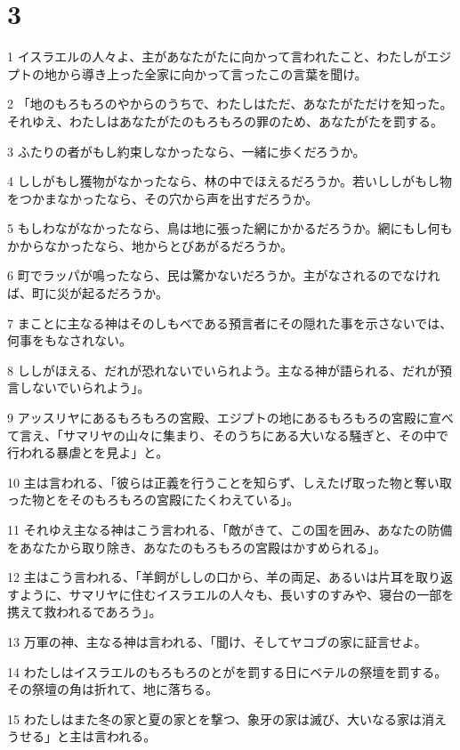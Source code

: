 \chapter{3}

\par 1 イスラエルの人々よ、主があなたがたに向かって言われたこと、わたしがエジプトの地から導き上った全家に向かって言ったこの言葉を聞け。
\par 2 「地のもろもろのやからのうちで、わたしはただ、あなたがただけを知った。それゆえ、わたしはあなたがたのもろもろの罪のため、あなたがたを罰する。
\par 3 ふたりの者がもし約束しなかったなら、一緒に歩くだろうか。
\par 4 ししがもし獲物がなかったなら、林の中でほえるだろうか。若いししがもし物をつかまなかったなら、その穴から声を出すだろうか。
\par 5 もしわながなかったなら、鳥は地に張った網にかかるだろうか。網にもし何もかからなかったなら、地からとびあがるだろうか。
\par 6 町でラッパが鳴ったなら、民は驚かないだろうか。主がなされるのでなければ、町に災が起るだろうか。
\par 7 まことに主なる神はそのしもべである預言者にその隠れた事を示さないでは、何事をもなされない。
\par 8 ししがほえる、だれが恐れないでいられよう。主なる神が語られる、だれが預言しないでいられよう」。
\par 9 アッスリヤにあるもろもろの宮殿、エジプトの地にあるもろもろの宮殿に宣べて言え、「サマリヤの山々に集まり、そのうちにある大いなる騒ぎと、その中で行われる暴虐とを見よ」と。
\par 10 主は言われる、「彼らは正義を行うことを知らず、しえたげ取った物と奪い取った物とをそのもろもろの宮殿にたくわえている」。
\par 11 それゆえ主なる神はこう言われる、「敵がきて、この国を囲み、あなたの防備をあなたから取り除き、あなたのもろもろの宮殿はかすめられる」。
\par 12 主はこう言われる、「羊飼がししの口から、羊の両足、あるいは片耳を取り返すように、サマリヤに住むイスラエルの人々も、長いすのすみや、寝台の一部を携えて救われるであろう」。
\par 13 万軍の神、主なる神は言われる、「聞け、そしてヤコブの家に証言せよ。
\par 14 わたしはイスラエルのもろもろのとがを罰する日にベテルの祭壇を罰する。その祭壇の角は折れて、地に落ちる。
\par 15 わたしはまた冬の家と夏の家とを撃つ、象牙の家は滅び、大いなる家は消えうせる」と主は言われる。

